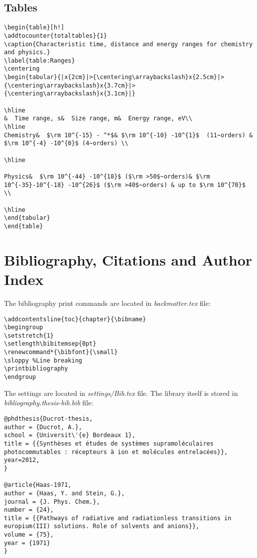 \subsection{Tables}


\begin{lstlisting}
\begin{table}[h!]
\addtocounter{totaltables}{1}
\caption{Characteristic time, distance and energy ranges for chemistry and physics.}
\label{table:Ranges}
\centering
\begin{tabular}{|x{2cm}|>{\centering\arraybackslash}x{2.5cm}|>{\centering\arraybackslash}x{3.7cm}|>{\centering\arraybackslash}x{3.1cm}|}

\hline  
&  Time range, s&  Size range, m&  Energy range, eV\\ 
\hline  
Chemistry&  $\rm 10^{-15} - ^*$& $\rm 10^{-10} -10^{1}$  (11~orders) & $\rm 10^{-4} -10^{0}$ (4~orders) \\

\hline  

Physics&  $\rm 10^{-44} -10^{18}$ ($\rm >50$~orders)& $\rm 10^{-35}-10^{-18} -10^{26}$ ($\rm >40$~orders) & up to $\rm 10^{70}$ \\

\hline 
\end{tabular} 
\end{table}
\end{lstlisting}






\section{Bibliography, Citations and Author Index}

The bibliography print commands are located in \textit{backmatter.tex} file:

\begin{lstlisting}
\addcontentsline{toc}{chapter}{\bibname}
\begingroup
\setstretch{1}
\setlength\bibitemsep{0pt}
\renewcommand*{\bibfont}{\small}
\sloppy %Line breaking
\printbibliography
\endgroup
\end{lstlisting}

The settings are located in \textit{settings/Bib.tex} file. The library itself is stored in \textit{bibliography.thesis-bib.bib} file:

\begin{lstlisting}
@phdthesis{Ducrot-thesis,
author = {Ducrot, A.},
school = {Universit\'{e} Bordeaux 1},
title = {{Synthèses et études de systèmes supramoléculaires photocommutables : récepteurs à ion et molécules entrelacées}},
year=2012,
}

@article{Haas-1971,
author = {Haas, Y. and Stein, G.},
journal = {J. Phys. Chem.},
number = {24},
title = {{Pathways of radiative and radiationless transitions in europium(III) solutions. Role of solvents and anions}},
volume = {75},
year = {1971}
}
\end{lstlisting}

